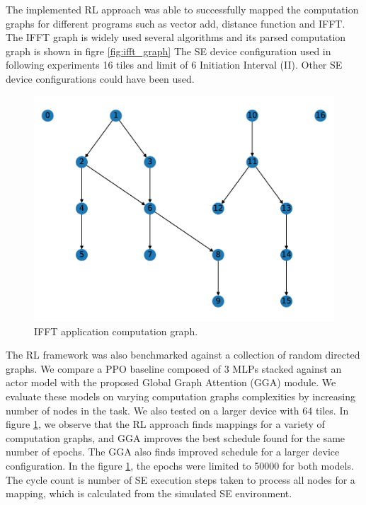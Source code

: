 The implemented RL approach was able to successfully mapped the computation graphs for different programs such as 
vector add, distance function and IFFT. The IFFT graph is widely used several algorithms and its parsed computation graph is shown in figre \ref{fig:ifft_graph} 
The SE device configuration used in following experiments 16 tiles and limit of 6 Initiation Interval (II). 
Other SE device configurations could have been used.

\begin{figure}[h]
  \centering
  \includegraphics[scale=0.4]{fig/ifft_graph.pdf}
  \caption{IFFT application computation graph.}
  \label{fig:nodes_graph}
\end{figure}


The RL framework was also benchmarked against a collection of random directed graphs. We compare a 
PPO baseline composed of 3 MLPs stacked against an actor model with the proposed Global Graph Attention (GGA) module.
We evaluate these models on varying computation graphs complexities by increasing number of nodes in the task. 
We also tested on a larger device with 64 tiles.
In figure \ref{fig:nodes_graph}, we observe that the RL approach finds mappings for a variety of computation graphs, and GGA
improves the best schedule found for the same number of epochs. The GGA also finds improved schedule for a larger device configuration. 
In the figure \ref{fig:nodes_graph}, the epochs were limited to 50000 for both models. 
The cycle count is number of SE execution steps taken to process all nodes for a mapping, which is calculated from the simulated SE environment. 

